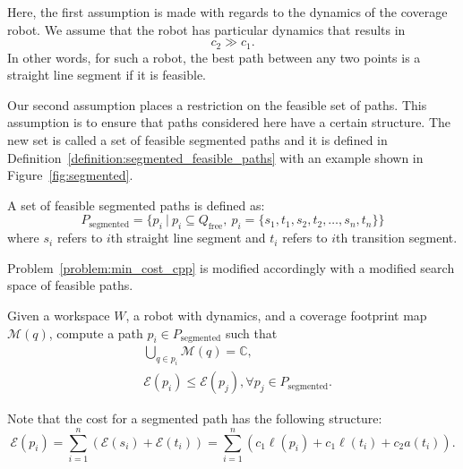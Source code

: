\documentclass[../main.tex]{subfiles}
\begin{document}
Here, the first assumption is made with regards to the dynamics of the coverage robot. We assume that the robot has particular dynamics that results in
\begin{equation}
	c_2 \gg c_1.
\end{equation}
In other words, for such a robot, the best path between any two points is a straight line segment if it is feasible.

Our second assumption places a restriction on the feasible set of paths. This assumption is to ensure that paths considered here have a certain structure. The new set is called a set of feasible segmented paths and it is defined in Definition~\ref{definition:segmented_feasible_paths} with an example shown in Figure~\ref{fig:segmented}.
\begin{definition}
\label{definition:segmented_feasible_paths}
A set of feasible segmented paths is defined as:
	\begin{equation}
		P_{\text{segmented}}=\{p_i\ |\ p_i\subseteq Q_{\text{free}},\  p_i=\{s_1,t_1,s_2,t_2,\dots,s_n,t_n\}\}
	\end{equation}
	where $s_i$ refers to $i$th straight line segment and $t_i$ refers to $i$th transition segment.
\end{definition}

Problem~\ref{problem:min_cost_cpp} is modified accordingly with a modified search space of feasible paths.
\begin{problem}
\label{problem:min_cost_cpp_with_lines}
	Given a workspace $W$, a robot with dynamics, and a coverage footprint map $\mathcal{M}(q)$, compute a path $p_i\in P_{\text{segmented}}$ such that
	\begin{equation}
	\label{condition:full_coverage_2}
	\begin{aligned}
		& \bigcup_{q\in p_i}\mathcal{M}(q)=\mathbb{C},\\
		& \mathcal{E}(p_i)\leq\mathcal{E}(p_j), \forall p_j\in P_{\text{segmented}}.
	\end{aligned}
	\end{equation}
\end{problem}

Note that the cost for a segmented path has the following structure:
\begin{equation}
	\label{eq:segmented_cost}
	\mathcal{E}(p_i)=\sum_{i=1}^n(\mathcal{E}(s_i)+\mathcal{E}(t_i))=\sum_{i=1}^n(c_1\ell(p_i)+c_1\ell(t_i)+c_2a(t_i)).
\end{equation}
\end{document}
